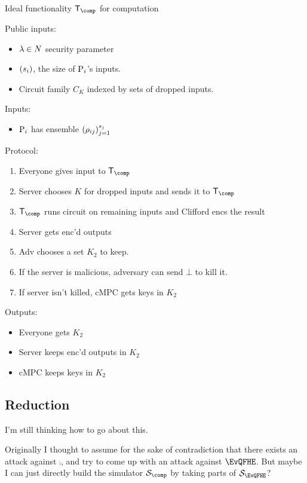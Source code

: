 \begin{protocol}{Ideal functionality $\trustp_\comp$ for computation}

	Public inputs:
	\begin{itemize}
		\item $\lambda\in\relax{N}$ security parameter
		\item $\left(s_i\right)$, the size of $\operatorname{P}_i$'s inputs.
		\item Circuit family $C_K$ indexed by sets of dropped inputs.
	\end{itemize}

	Inputs:
	\begin{itemize}
		\item $\operatorname{P}_i$ has ensemble $\left(\rho_{ij}\right)_{j=1}^{s_j}$
	\end{itemize}

	Protocol:
	\begin{enumerate}
		\item Everyone gives input to $\trustp_\comp$
		\item Server chooses $K$ for dropped inputs and sends it to $\trustp_\comp$
		\item $\trustp_\comp$ runs circuit on remaining inputs and Clifford encs the result
		\item Server gets enc'd outputs
		\item Adv chooses a set $K_2$ to keep.
		\item If the server is malicious, adversary can send $\bot$ to kill it.
		\item If server isn't killed, cMPC gets keys in $K_2$
	\end{enumerate}

	Outputs:
	\begin{itemize}
		\item Everyone gets $K_2$
		\item Server keeps enc'd outputs in $K_2$
		\item cMPC keeps keys in $K_2$
	\end{itemize}
\end{protocol}

\subsection{Reduction}

I'm still thinking how to go about this.

Originally I thought to assume for the sake of contradiction that there exists an attack against $\comp$,
and try to come up with an attack against $\EvQFHE$.
But maybe I can just directly build the simulator $\cS_\comp$ by taking parts of $\cS_\EvQFHE$?
